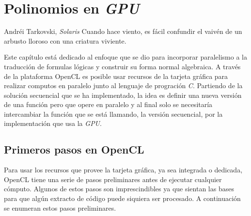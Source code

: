 \chapter{Polinomios en \textit{GPU}}

\begin{chapquote}{Andréi Tarkovski, \textit{Solaris}}
Cuando hace viento, es fácil confundir el vaivén de un arbusto lloroso con una criatura viviente.
\end{chapquote}

Este capítulo está dedicado al enfoque que se dio para incorporar paralelismo a la traducción de formulas lógicas y construir su forma normal algebraica. A través de la plataforma OpenCL es posible usar recursos de la tarjeta gráfica para realizar computos en paralelo junto al lenguaje de progración \textit{C}. Partiendo de la solución secuencial que se ha implementado, la idea es definir una nueva versión de una función pero que opere en paralelo y al final solo se necesitaría intercambiar la función que se está llamando, la versión secuencial, por la implementación que usa la \textit{GPU}.

\section{Primeros pasos en OpenCL}

Para usar los recursos que provee la tarjeta gráfica, ya sea integrada o dedicada, OpenCL tiene una serie de pasos preliminares antes de ejecutar cualquier cómputo. Algunos de estos pasos son imprescindibles ya que sientan las bases para que algún extracto de código puede siquiera ser procesado. A continuación se enumeran estos pasos preliminares.

